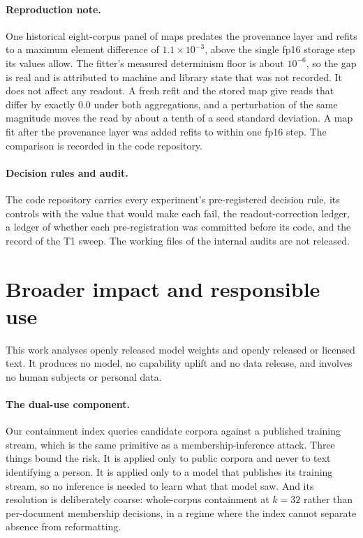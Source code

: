 \documentclass{article}
\begin{document}
\paragraph{Reproduction note.} One historical eight-corpus panel of maps predates the provenance
layer and refits to a maximum element difference of $1.1\times10^{-3}$, above the single fp16
storage step its values allow. The fitter's measured determinism floor is about $10^{-6}$, so the
gap is real and is attributed to machine and library state that was not recorded. It does not
affect any readout. A fresh refit and the stored map give reads that differ by exactly $0.0$ under
both aggregations, and a perturbation of the same magnitude moves the read by about a tenth of a
seed standard deviation. A map fit after the provenance layer was added refits to within one fp16
step. The comparison is recorded in the code repository.

\paragraph{Decision rules and audit.} The code repository carries every experiment's pre-registered
decision rule, its controls with the value that would make each fail, the readout-correction ledger,
a ledger of whether each pre-registration was committed before its code, and the record of the T1
sweep. The working files of the internal audits are not released.

\section{Broader impact and responsible use}

This work analyses openly released model weights and openly released or licensed text. It produces
no model, no capability uplift and no data release, and involves no human subjects or personal data.

\paragraph{The dual-use component.} Our containment index queries candidate corpora
against a published training stream, which is the same primitive as a membership-inference attack.
Three things bound the risk. It is applied only to public corpora and never to text identifying a
person. It is applied only to a model that publishes its training stream, so no inference is needed
to learn what that model saw. And its resolution is deliberately coarse: whole-corpus containment at
$k{=}32$ rather than per-document membership decisions, in a regime where the index cannot separate
absence from reformatting.
\end{document}
